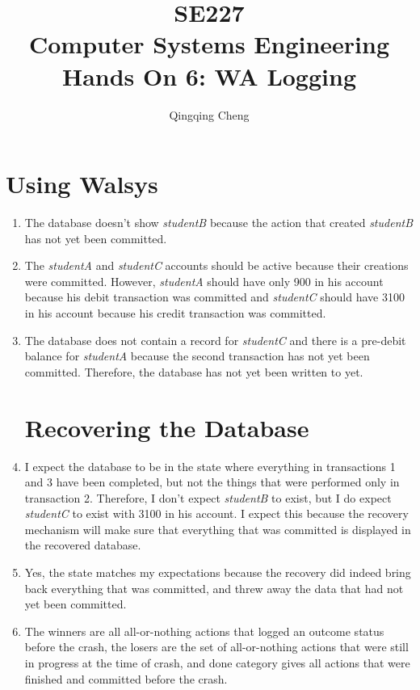 \documentclass[psamsfonts]{amsart}
\title{SE227 \\
Computer Systems Engineering \\
Hands On 6: WA Logging}
\author{Qingqing Cheng}
\begin{document}
\maketitle

   \section{Using Walsys}

\begin{enumerate}
  \item The database doesn't show \emph{studentB} because the action that created \emph{studentB} has not yet been committed.
  \item The \emph{studentA} and \emph{studentC} accounts should be active because their creations were committed. However, \emph{studentA} should have only 900 in his account because his debit transaction was committed and \emph{studentC} should have 3100 in his account because his credit transaction was committed.
  \item The database does not contain a record for \emph{studentC} and there is a pre-debit balance for \emph{studentA} because the second transaction has not yet been committed. Therefore, the database has not yet been written to yet.

    \section{Recovering the Database}
  \item I expect the database to be in the state where everything in transactions 1 and 3 have been completed, but not the things that were performed only in transaction 2. Therefore, I don't expect \emph{studentB} to exist, but I do expect \emph{studentC} to exist with 3100 in his account. I expect this because the recovery mechanism will make sure that everything that was committed is displayed in the recovered database.
  \item Yes, the state matches my expectations because the recovery did indeed bring back everything that was committed, and threw away the data that had not yet been committed.
  \item The winners are all all-or-nothing actions that logged an outcome status before the crash, the losers are the set of all-or-nothing actions that were still in progress at the time of crash, and done category gives all actions that were finished and committed before the crash.


\end{enumerate}
\end{document}
